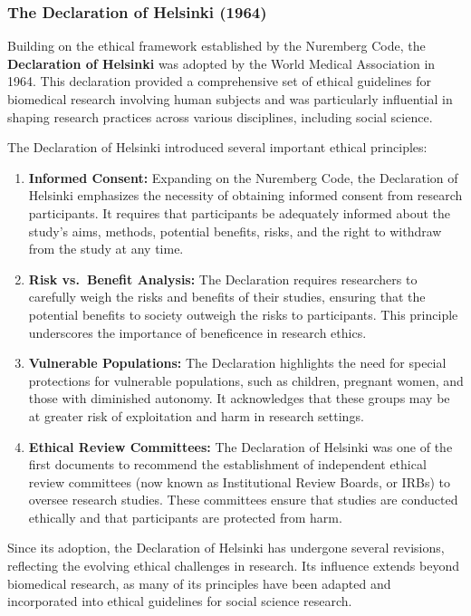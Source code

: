 \documentclass[
]{book}
\begin{document}
\subsubsection*{The Declaration of Helsinki (1964)}\label{the-declaration-of-helsinki-1964}

Building on the ethical framework established by the Nuremberg Code, the \textbf{Declaration of Helsinki} was adopted by the World Medical Association in 1964. This declaration provided a comprehensive set of ethical guidelines for biomedical research involving human subjects and was particularly influential in shaping research practices across various disciplines, including social science.

The Declaration of Helsinki introduced several important ethical principles:

\begin{enumerate}
\def\labelenumi{\arabic{enumi}.}
\item
  \textbf{Informed Consent:} Expanding on the Nuremberg Code, the Declaration of Helsinki emphasizes the necessity of obtaining informed consent from research participants. It requires that participants be adequately informed about the study's aims, methods, potential benefits, risks, and the right to withdraw from the study at any time.
\item
  \textbf{Risk vs.~Benefit Analysis:} The Declaration requires researchers to carefully weigh the risks and benefits of their studies, ensuring that the potential benefits to society outweigh the risks to participants. This principle underscores the importance of beneficence in research ethics.
\item
  \textbf{Vulnerable Populations:} The Declaration highlights the need for special protections for vulnerable populations, such as children, pregnant women, and those with diminished autonomy. It acknowledges that these groups may be at greater risk of exploitation and harm in research settings.
\item
  \textbf{Ethical Review Committees:} The Declaration of Helsinki was one of the first documents to recommend the establishment of independent ethical review committees (now known as Institutional Review Boards, or IRBs) to oversee research studies. These committees ensure that studies are conducted ethically and that participants are protected from harm.
\end{enumerate}

Since its adoption, the Declaration of Helsinki has undergone several revisions, reflecting the evolving ethical challenges in research. Its influence extends beyond biomedical research, as many of its principles have been adapted and incorporated into ethical guidelines for social science research.
\end{document}
